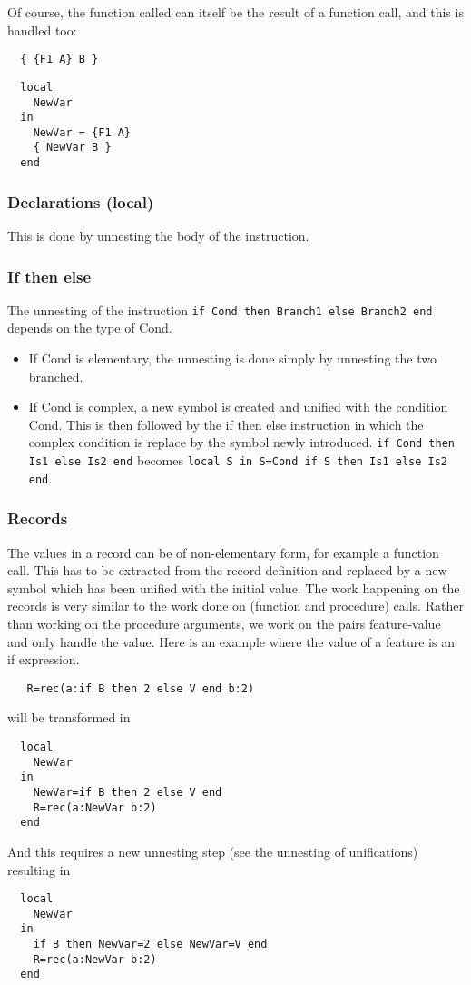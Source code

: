 \documentclass[a4paper]{memoir}
\begin{document}
Of course, the function called can itself be the result of a function call, and this is handled too:
\begin{lstlisting}
  { {F1 A} B }
\end{lstlisting}
\begin{lstlisting}
  local
    NewVar
  in
    NewVar = {F1 A}
    { NewVar B }
  end
\end{lstlisting}

\subsubsection{Declarations (local)}
This is done by unnesting the body of the instruction.
\subsubsection{If then else}
The unnesting of the instruction \lstinline!if Cond then Branch1 else Branch2 end! depends on the type of Cond. 
\begin{itemize}
  \item If Cond is elementary, the unnesting is done simply by unnesting the two branched.
  \item If Cond is complex, a new symbol is created and unified with the condition Cond. This is then followed by the if then else instruction in which the complex condition is replace by the symbol newly introduced.
    \lstinline!if Cond then Is1 else Is2 end! becomes \lstinline!local S in S=Cond if S then Is1 else Is2 end!.
\end{itemize}

\subsubsection{Records}
The values in a record can be of non-elementary form, for example a function call. This has to be extracted from the record definition and replaced by a new symbol which has been unified with the initial value. The work happening on the records is very similar to the work done on (function and procedure) calls. Rather than working on the procedure arguments, we work on the pairs feature-value and only handle the value. 
Here is an example where the value of a feature is an if expression.
\begin{lstlisting}
   R=rec(a:if B then 2 else V end b:2)
\end{lstlisting}
will be transformed in
\begin{lstlisting}
  local
    NewVar
  in
    NewVar=if B then 2 else V end
    R=rec(a:NewVar b:2)
  end
\end{lstlisting}
And this requires a new unnesting step (see the unnesting of unifications) resulting in 
\begin{lstlisting}
  local
    NewVar
  in
    if B then NewVar=2 else NewVar=V end
    R=rec(a:NewVar b:2)
  end
\end{lstlisting}
\end{document}
